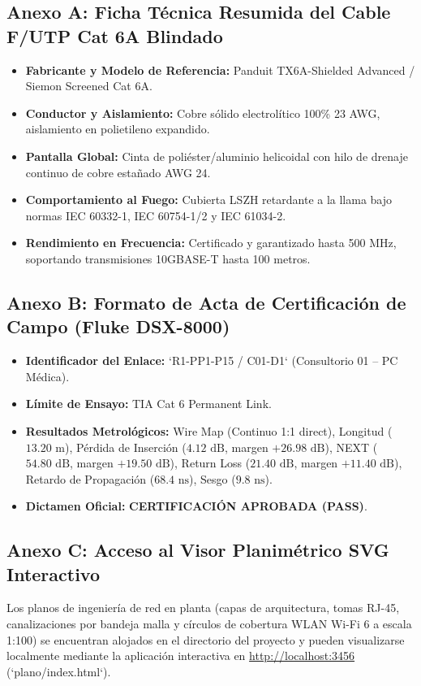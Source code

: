 \documentclass[11pt,a4paper]{article}
\begin{document}
\subsection{Anexo A: Ficha Técnica Resumida del Cable F/UTP Cat 6A Blindado}
\begin{itemize}[noitemsep]
    \item \textbf{Fabricante y Modelo de Referencia:} Panduit TX6A-Shielded Advanced / Siemon Screened Cat 6A.
    \item \textbf{Conductor y Aislamiento:} Cobre sólido electrolítico 100\% 23 AWG, aislamiento en polietileno expandido.
    \item \textbf{Pantalla Global:} Cinta de poliéster/aluminio helicoidal con hilo de drenaje continuo de cobre estañado AWG 24.
    \item \textbf{Comportamiento al Fuego:} Cubierta LSZH retardante a la llama bajo normas IEC 60332-1, IEC 60754-1/2 y IEC 61034-2.
    \item \textbf{Rendimiento en Frecuencia:} Certificado y garantizado hasta 500 MHz, soportando transmisiones 10GBASE-T hasta 100 metros.
\end{itemize}

\subsection{Anexo B: Formato de Acta de Certificación de Campo (Fluke DSX-8000)}
\begin{itemize}[noitemsep]
    \item \textbf{Identificador del Enlace:} `R1-PP1-P15 / C01-D1` (Consultorio 01 -- PC Médica).
    \item \textbf{Límite de Ensayo:} TIA Cat 6 Permanent Link.
    \item \textbf{Resultados Metrológicos:} Wire Map (Continuo 1:1 direct), Longitud ($13.20\text{ m}$), Pérdida de Inserción ($4.12\text{ dB}$, margen $+26.98\text{ dB}$), NEXT ($54.80\text{ dB}$, margen $+19.50\text{ dB}$), Return Loss ($21.40\text{ dB}$, margen $+11.40\text{ dB}$), Retardo de Propagación ($68.4\text{ ns}$), Sesgo ($9.8\text{ ns}$).
    \item \textbf{Dictamen Oficial:} \textbf{CERTIFICACIÓN APROBADA (PASS)}.
\end{itemize}

\subsection{Anexo C: Acceso al Visor Planimétrico SVG Interactivo}
Los planos de ingeniería de red en planta (capas de arquitectura, tomas RJ-45, canalizaciones por bandeja malla y círculos de cobertura WLAN Wi-Fi 6 a escala 1:100) se encuentran alojados en el directorio del proyecto y pueden visualizarse localmente mediante la aplicación interactiva en \url{http://localhost:3456} (`plano/index.html`).
\end{document}
